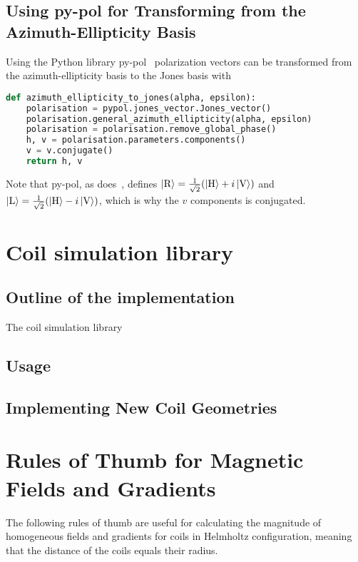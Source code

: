 \section*{Using py-pol for Transforming from the Azimuth-Ellipticity Basis}
Using the Python library py-pol~\cite{noauthor_python_nodate} polarization vectors can be transformed from the azimuth-ellipticity basis to the Jones basis with
\begin{lstlisting}[language=Python]
def azimuth_ellipticity_to_jones(alpha, epsilon):
    polarisation = pypol.jones_vector.Jones_vector()
    polarisation.general_azimuth_ellipticity(alpha, epsilon)
    polarisation = polarisation.remove_global_phase()
    h, v = polarisation.parameters.components()
    v = v.conjugate()
    return h, v
\end{lstlisting}

Note that py-pol, as does~\cite{trager_springer_2012}, defines $\Ket{\text{R}} = \frac{1}{\sqrt{2}}(\Ket{\text{H}}+i\Ket{\text{V}})$ and $\Ket{\text{L}} = \frac{1}{\sqrt{2}}(\Ket{\text{H}}-i\Ket{\text{V}})$, which is why the $v$ components is conjugated.




\chapter{Coil simulation library}\label{ch:coil_simulation_library}
\section*{Outline of the implementation}
The coil simulation library 

\section*{Usage}

\section*{Implementing New Coil Geometries}


\chapter{Rules of Thumb for Magnetic Fields and Gradients}
The following rules of thumb are useful for calculating the magnitude of homogeneous fields and gradients for coils in Helmholtz configuration, meaning that the distance of the coils equals their radius.

